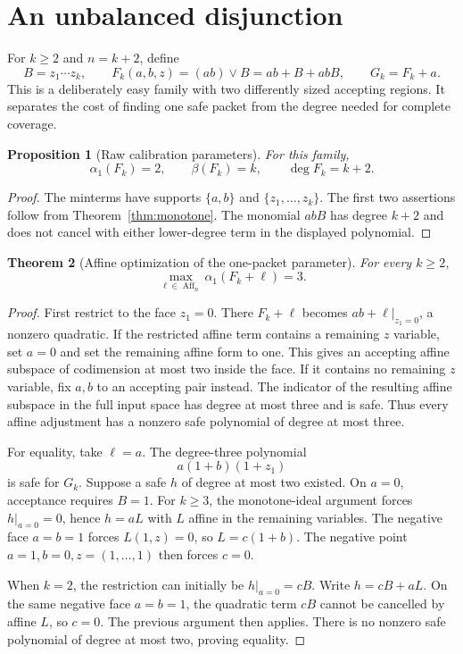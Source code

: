 \documentclass[11pt,letterpaper,oneside]{report}
\theoremstyle{komorebi}
\newtheorem{theorem}{Theorem}[chapter]
\newtheorem{proposition}[theorem]{Proposition}
\newcommand{\Aff}{\operatorname{Aff}}
\begin{document}
\section{An unbalanced disjunction}
For $k\ge2$ and $n=k+2$, define
\[
 B=z_1\cdots z_k,\qquad
 F_k(a,b,z)=(ab)\lor B=ab+B+abB,\qquad G_k=F_k+a.
\]
This is a deliberately easy family with two differently sized accepting regions. It separates the cost of finding one safe packet from the degree needed for complete coverage.

\begin{proposition}[Raw calibration parameters]\label{prop:raw-family}
For this family,
\[
 \alpha_1(F_k)=2,\qquad\beta(F_k)=k,\qquad\deg F_k=k+2.
\]
\end{proposition}
\begin{proof}
The minterms have supports $\{a,b\}$ and $\{z_1,\ldots,z_k\}$. The first two assertions follow from Theorem~\ref{thm:monotone}. The monomial $abB$ has degree $k+2$ and does not cancel with either lower-degree term in the displayed polynomial.
\end{proof}

\begin{theorem}[Affine optimization of the one-packet parameter]\label{thm:family-alpha}
For every $k\ge2$,
\[
 \max_{\ell\in\Aff_n}\alpha_1(F_k+\ell)=3.
\]
\end{theorem}
\begin{proof}
First restrict to the face $z_1=0$. There $F_k+\ell$ becomes $ab+\ell|_{z_1=0}$, a nonzero quadratic. If the restricted affine term contains a remaining $z$ variable, set $a=0$ and set the remaining affine form to one. This gives an accepting affine subspace of codimension at most two inside the face. If it contains no remaining $z$ variable, fix $a,b$ to an accepting pair instead. The indicator of the resulting affine subspace in the full input space has degree at most three and is safe. Thus every affine adjustment has a nonzero safe polynomial of degree at most three.

For equality, take $\ell=a$. The degree-three polynomial
\[
 a(1+b)(1+z_1)
\]
is safe for $G_k$. Suppose a safe $h$ of degree at most two existed. On $a=0$, acceptance requires $B=1$. For $k\ge3$, the monotone-ideal argument forces $h|_{a=0}=0$, hence $h=aL$ with $L$ affine in the remaining variables. The negative face $a=b=1$ forces $L(1,z)=0$, so $L=c(1+b)$. The negative point $a=1,b=0,z=(1,\ldots,1)$ then forces $c=0$.

When $k=2$, the restriction can initially be $h|_{a=0}=cB$. Write $h=cB+aL$. On the same negative face $a=b=1$, the quadratic term $cB$ cannot be cancelled by affine $L$, so $c=0$. The previous argument then applies. There is no nonzero safe polynomial of degree at most two, proving equality.
\end{proof}
\end{document}
